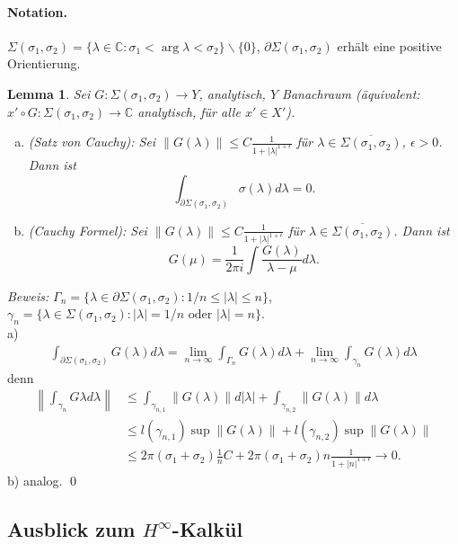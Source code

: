 \documentclass[12pt]{extreport} %
\newtheorem{Lemma}[Satz]{Lemma}
\numberwithin{equation}{section}
\newcommand{\C}{\mathbb{C}} %
\newcommand{\Bew}{\emph{Beweis: }}
\begin{document}
	\paragraph{Notation.} $\Sigma(\sigma_1,\sigma_2) = \{\lambda\in \C \colon \sigma_1<\arg\lambda <\sigma_2 \}\backslash\{0\}$, $\partial\Sigma(\sigma_1,\sigma_2)$ erhält eine positive Orientierung.
	
	\begin{Lemma}
		Sei $G\colon \Sigma(\sigma_1,\sigma_2)\rightarrow Y$, analytisch, $Y$ Banachraum (äquivalent: $x'\circ G\colon \Sigma(\sigma_1,\sigma_2)\rightarrow\C$ analytisch, für alle $x'\in X'$).
		\begin{enumerate}[a)]
			\item (Satz von Cauchy): Sei $\|G(\lambda)\| \leq C \frac{1}{1+|\lambda|^{1+\epsilon}}$ für $\lambda \in \overline{\Sigma(\sigma_1,\sigma_2)}$, $\epsilon>0$. Dann ist 
			$$\int_{\partial\Sigma(\sigma_1,\sigma_2)} \sigma(\lambda) d\lambda = 0.$$
			\item (Cauchy Formel): Sei $\|G(\lambda)\| \leq C\frac{1}{1+|\lambda|^{1+\epsilon}}$ für $\lambda \in \overline{\Sigma(\sigma_1,\sigma_2)}$. Dann ist 
			$$G(\mu) = \frac{1}{2\pi i}\int \frac{G(\lambda)}{\lambda- \mu}d\lambda.$$
		\end{enumerate}
	\end{Lemma}
	
	\Bew $\Gamma_n = \{\lambda \in \partial \Sigma(\sigma_1,\sigma_2)\colon 1/n\leq|\lambda|\leq n \}$, $\gamma_n =\{\lambda \in \Sigma(\sigma_1,\sigma_2)\colon |\lambda|=1/n \text{ oder } |\lambda| = n \}$.\\
	a) 
	\begin{align*}
		\int_{\partial \Sigma(\sigma_1,\sigma_2)} G(\lambda) d\lambda = \lim_{n\rightarrow \infty} \int_{\Gamma_n} G(\lambda) d\lambda + \lim\limits_{n\rightarrow\infty} \int_{\gamma_n} G(\lambda) d\lambda
	\end{align*}
	denn 
	\begin{align*}
		\left\| \int_{\gamma_n} G\lambda d\lambda\right\| &\leq \int_{\gamma_{n,1}} \|G(\lambda)\| d|\lambda| + \int_{\gamma_{n,2}} \|G(\lambda)\|d\lambda \\
		&\leq l(\gamma_{n,1}) \sup\|G(\lambda)\| + l(\gamma_{n,2}) \sup\|G(\lambda)\|\\
		&\leq 2\pi (\sigma_1+\sigma_2) \frac{1}{n} C + 2\pi(\sigma_1+\sigma_2) n \frac{1}{1 + |n|^{1+\epsilon}} \rightarrow 0.
	\end{align*}
	b) analog.
	\qed
	
	\subsection*{Ausblick zum $H^\infty$-Kalkül}
	
\end{document}
